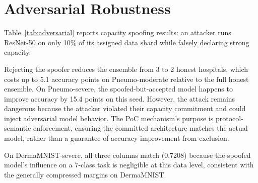 \documentclass[conference]{IEEEtran}
\begin{document}
\section{Adversarial Robustness}

Table~\ref{tab:adversarial} reports capacity spoofing results: an attacker runs ResNet-50 on only 10\% of its assigned data shard while falsely declaring strong capacity.

\begin{table}[H]
\centering
\caption{Adversarial robustness, single seed (\texttt{adv\_42}). ``Honest'' = 3-hospital ensemble with all participants legitimate. ``Spoofed (No PoC)'' = attacker accepted, ensemble includes the spoofed model. ``Spoofed (PoC on)'' = attacker rejected by the smart contract, leaving a 2-hospital honest subset.}
\label{tab:adversarial}
\end{table}

Rejecting the spoofer reduces the ensemble from 3 to 2 honest hospitals, which costs up to 5.1 accuracy points on Pneumo-moderate relative to the full honest ensemble. On Pneumo-severe, the spoofed-but-accepted model happens to improve accuracy by 15.4 points on this seed. However, the attack remains dangerous because the attacker violated their capacity commitment and could inject adversarial model behavior. The PoC mechanism's purpose is protocol-semantic enforcement, ensuring the committed architecture matches the actual model, rather than a guarantee of accuracy improvement from exclusion.

On DermaMNIST-severe, all three columns match (0.7208) because the spoofed model's influence on a 7-class task is negligible at this data level, consistent with the generally compressed margins on DermaMNIST.
\end{document}
